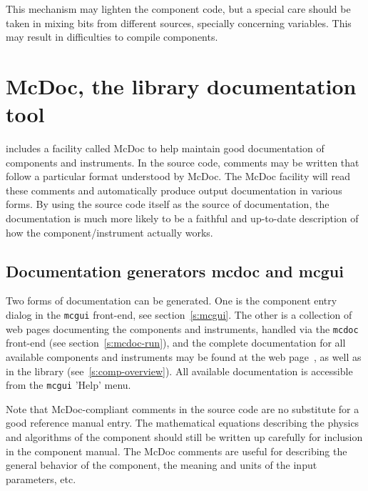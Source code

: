 This mechanism may lighten the component code, but a special care should be taken in mixing bits from different sources, specially concerning variables. This may result in difficulties to compile components.


\section{McDoc, the \MCS library documentation tool}
\label{s:mcdoc}

\MCS includes a facility called McDoc to help maintain good documentation of
components and instruments. In the source code, comments may be
written that follow a particular format understood by McDoc. The McDoc facility
will read these comments and automatically produce output documentation in
various forms. By using the source code itself as the source of documentation,
the documentation is much more likely to be a faithful and up-to-date
description of how the component/instrument actually works.

\subsection{Documentation generators mcdoc and mcgui}

Two forms of documentation can be generated. One
is the component entry dialog in the \verb+mcgui+ front-end, see
section~\ref{s:mcgui}. The other is a collection of web pages documenting
the components and instruments, handled via the \verb+mcdoc+ front-end (see section~\ref{s:mcdoc-run}), and the complete documentation for all available
\MCS components and instruments may be found at the \MCS
web page~\cite{mcstas_webpage}, as well as in the \MCS library
(see~\ref{s:comp-overview}). All available \MCS documentation is accessible from the \verb+mcgui+ 'Help' menu.

Note that McDoc-compliant comments in the source code are no substitute
for a good reference manual entry. The mathematical equations describing
the physics and algorithms of the component should still be written up
carefully for inclusion in the component manual. The McDoc comments are
useful for describing the general behavior of the component, the
meaning and units of the input parameters, etc.


